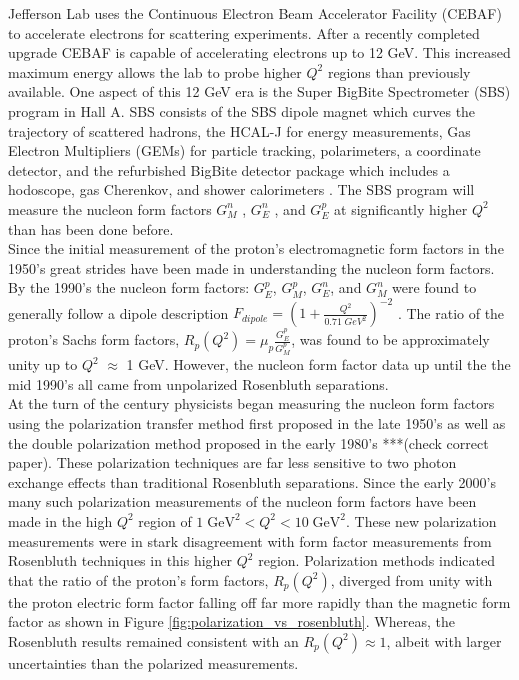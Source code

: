 \documentclass[review]{elsarticle}
\newcommand{\hcal}{HCAL-J }
\newcommand{\jlab}{Jefferson Lab }
\newcommand{\q}{$Q^2$ }
\begin{document}
\jlab uses the Continuous Electron Beam Accelerator Facility (CEBAF) to accelerate electrons for scattering experiments. After a recently completed upgrade CEBAF is capable of accelerating electrons up to 12 GeV. This increased maximum energy allows the lab to probe higher \q regions than previously available. One aspect of this 12 GeV era is the Super BigBite Spectrometer (SBS) program in Hall A. SBS consists of the SBS dipole magnet which curves the trajectory of scattered hadrons, the \hcal for energy measurements, Gas Electron Multipliers (GEMs) for particle tracking, polarimeters, a coordinate detector, and the refurbished BigBite detector package which includes a hodoscope, gas Cherenkov, and shower calorimeters \cite{brio_2018}. The SBS program will measure the nucleon form factors $G_M^n$ \cite{gmn_proposal}, $G_E^n$ \cite{gen_proposal}, and $G_E^p$ \cite{gep_proposal} at significantly higher \q than has been done before. \\

Since the initial measurement of the proton's electromagnetic form factors in the 1950's \cite{hofstadter_1956} great strides have been made in understanding the nucleon form factors. By the 1990's the nucleon form factors: $G_E^p$, $G_M^p$, $G_E^n$, and $G_M^n$ were found to generally follow a dipole description $F_{dipole} = \left( 1+\frac{Q^2}{0.71 \;GeV^2}\right)^{-2}$ \cite{bosted_1995}. The ratio of the proton's Sachs form factors, $R_p(Q^2) = \mu_{p}\frac{G_E^p}{G_M^p}$, was found to be approximately unity up to $Q^2$ $\approx$ 1 GeV. However, the nucleon form factor data up until the the mid 1990's all came from unpolarized Rosenbluth separations.\\

At the turn of the century physicists began measuring the nucleon form factors using the polarization transfer method first proposed in the late 1950's \cite{polarization_transfer} as well as the double polarization method proposed in the early 1980's \cite{double_polarization} ***(check correct paper). These polarization techniques are far less sensitive to two photon exchange effects than traditional Rosenbluth separations. Since the early 2000's many such polarization measurements of the nucleon form factors have been made in the high \q region of $1\; \text{GeV}^2 < Q^2 < 10\; \text{GeV}^2$. These new polarization measurements were in stark disagreement with form factor measurements from Rosenbluth techniques in this higher $Q^2$ region. Polarization methods indicated that the ratio of the proton's form factors, $R_p(Q^2)$, diverged from unity with the proton electric form factor falling off far more rapidly than the magnetic form factor as shown in Figure \ref{fig:polarization_vs_rosenbluth}. Whereas, the Rosenbluth results remained consistent with an $R_p(Q^2) \approx 1$, albeit with larger uncertainties than the polarized measurements.\\
\end{document}
